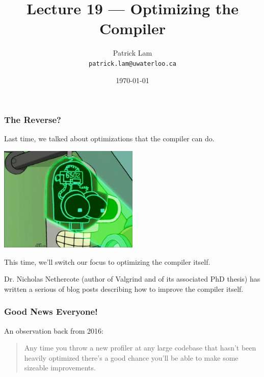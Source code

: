 


\title{Lecture 19 --- Optimizing the Compiler}

\author{Patrick Lam \\ \small \texttt{patrick.lam@uwaterloo.ca}}
\date{\today}




\begin{frame}
  \titlepage

\end{frame}


\begin{frame}
\frametitle{The Reverse?}

Last time, we talked about optimizations that the compiler can do.

\begin{center}
	\includegraphics[width=0.5\textwidth]{images/bender-brain.jpeg}
\end{center}

This time, we'll switch our focus to optimizing the compiler itself.

Dr. Nicholas Nethercote (author of Valgrind and of its associated PhD thesis) has written a serious of blog posts describing how to improve the compiler itself.

\end{frame}


\begin{frame}
\frametitle{Good News Everyone!}

An observation back from 2016:
\begin{quote}
Any time you throw a new profiler at any large codebase that hasn't been heavily optimized there's a good chance you'll be able to make some sizeable improvements.
\end{quote}

\end{frame}


